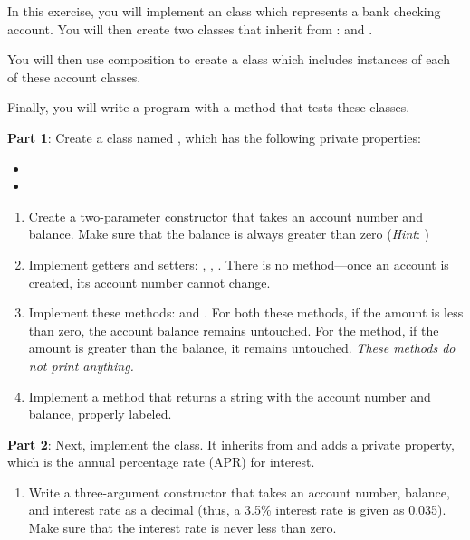 \begin{exercise}

In this exercise, you will implement an  class which represents a bank checking account. You will then create two classes that inherit from :  and .

You will then use composition to create a  class which includes instances of each of these account classes.

Finally, you will write a program with a  method that tests these classes.

{\bf Part 1}: Create a class named , which has the following private properties:

\begin{itemize}
    \item {}
    \item {}
\end{itemize}

\begin{enumerate}
\item Create a two-parameter constructor that takes an account number and balance. Make sure that the balance is always greater than zero ({\em Hint}: )

\item Implement getters and setters: , , . There is no  method---once an account is created, its account number cannot change.

\item Implement these methods:  and . For both these methods, if the amount is less than zero, the account balance remains untouched. For the  method, if the amount is greater than the balance, it remains untouched. {\em These methods do not print anything.}

\item Implement a  method that returns a string with the account number and balance, properly labeled.
\end{enumerate}

{\bf Part 2}: Next, implement the  class. It inherits from  and adds a private  property, which is the annual percentage rate (APR) for interest.

\begin{enumerate}
\item Write a three-argument constructor that takes an account number, balance, and interest rate as a decimal (thus, a 3.5\% interest rate is given as 0.035). Make sure that the interest rate is never less than zero.


\end{enumerate}
\end{exercise}
